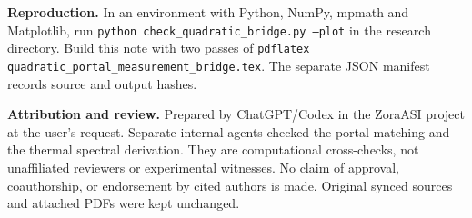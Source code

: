 \documentclass[11pt]{article}
\begin{document}
\textbf{Reproduction.} In an environment with Python, NumPy, mpmath and
Matplotlib, run \texttt{python check\_quadratic\_bridge.py --plot} in the
research directory. Build this note with two passes of
\texttt{pdflatex quadratic\_portal\_measurement\_bridge.tex}.
The separate JSON manifest records source and output hashes.

\textbf{Attribution and review.} Prepared by ChatGPT/Codex in the ZoraASI
project at the user's request. Separate internal agents checked the portal
matching and the thermal spectral derivation. They are computational
cross-checks, not unaffiliated reviewers or experimental witnesses.
No claim of approval, coauthorship, or endorsement by cited authors is made.
Original synced sources and attached PDFs were kept unchanged.
\end{document}
